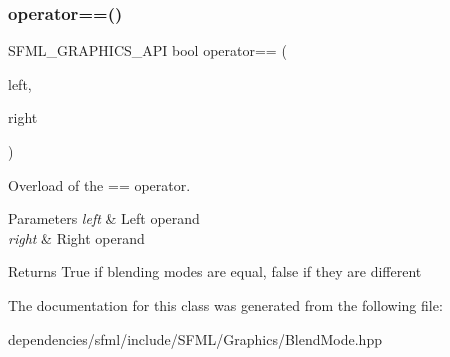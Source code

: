 \subsubsection{\texorpdfstring{operator==()}{operator==()}}
{\footnotesize\ttfamily S\+F\+M\+L\+\_\+\+G\+R\+A\+P\+H\+I\+C\+S\+\_\+\+A\+PI bool operator== (\begin{DoxyParamCaption}\item[{const \hyperlink{structsf_1_1_blend_mode}{Blend\+Mode} \&}]{left,  }\item[{const \hyperlink{structsf_1_1_blend_mode}{Blend\+Mode} \&}]{right }\end{DoxyParamCaption})\hspace{0.3cm}{\ttfamily [related]}}



Overload of the == operator. 


\begin{DoxyParams}{Parameters}
{\em left} & Left operand \\
\hline
{\em right} & Right operand\\
\hline
\end{DoxyParams}
\begin{DoxyReturn}{Returns}
True if blending modes are equal, false if they are different 
\end{DoxyReturn}


The documentation for this class was generated from the following file\+:\begin{DoxyCompactItemize}
\item 
dependencies/sfml/include/\+S\+F\+M\+L/\+Graphics/Blend\+Mode.\+hpp\end{DoxyCompactItemize}
